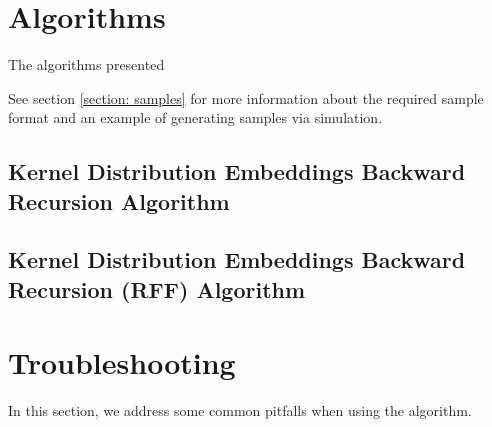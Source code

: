 \documentclass[11pt]{article}
\begin{document}

\section{Algorithms}
\label{section: algorithms}

The algorithms presented

See section \ref{section: samples} for more information about the required sample format and an example of generating samples via simulation.


\subsection{Kernel Distribution Embeddings Backward Recursion Algorithm}



\subsection{Kernel Distribution Embeddings Backward Recursion (RFF) Algorithm}



\section{Troubleshooting}

In this section, we address some common pitfalls when using the algorithm.
\end{document}
